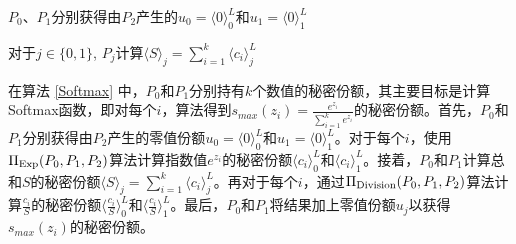 \begin{algorithm}[H]
	\SetAlgoLined
	
	
	$P_0$、$P_1$分别获得由$P_2$产生的$u_0=\langle 0\rangle_0^L$和$u_1=\langle 0\rangle_1^L$
	
	
	对于$j\in \{0, 1\}$, $P_j$计算$\langle S\rangle_j=\sum_{i=1}^k\langle c_i\rangle_j^L$
	
	
	\caption{ $\Pi_{\rm Softmax}(\{P_0, P_1\}, P_2)$ }
	\label{Softmax}
\end{algorithm}

在算法 \ref{Softmax} 中，$P_0$和$P_1$分别持有$k$个数值的秘密份额，其主要目标是计算Softmax函数，即对每个$i$，算法得到$s_{max}(z_i) = \frac{e^{z_i}}{\sum_{i=1}^k e^{z_i}}$的秘密份额。首先，$P_0$和$P_1$分别获得由$P_2$产生的零值份额$u_0=\langle 0\rangle_0^L$和$u_1=\langle 0\rangle_1^L$。对于每个$i$，使用$\Pi_{\rm Exp}({P_0, P_1}, P_2)$算法计算指数值$e^{z_i}$的秘密份额$\langle c_i\rangle_0^L$和$\langle c_i\rangle_1^L$。接着，$P_0$和$P_1$计算总和$S$的秘密份额$\langle S\rangle_j=\sum_{i=1}^k\langle c_i\rangle_j^L$。再对于每个$i$，通过$\Pi_{\rm Division}({P_0, P_1}, P_2)$算法计算$\frac{c_i}{S}$的秘密份额$\langle \frac{c_i}{S}\rangle_0^L$和$\langle \frac{c_i}{S}\rangle_1^L$。最后，$P_0$和$P_1$将结果加上零值份额$u_j$以获得$s_{max}(z_i)$的秘密份额。


